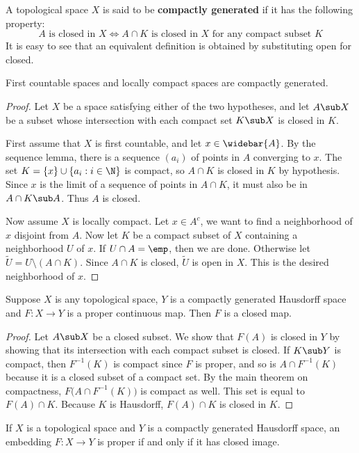 A topological space $X$ is said to be \textbf{compactly generated} if it has the following property: 
\[A\text{ is closed in $X$}\iff A\cap K\text{ is closed in $X$ for any compact subset $K$}\] 
It is easy to see that an equivalent definition is obtained by substituting open for closed.
\begin{lemma}
First countable spaces and locally compact spaces are compactly generated.
\end{lemma}
\begin{proof}
Let $X$ be a space satisfying either of the two hypotheses, and let $A\sub X$ be a subset whose intersection with each compact set $K\sub X$ is closed in $K$.\par
First assume that $X$ is first countable, and let $x\in\widebar{A}$. By the sequence lemma, there is a sequence $(a_i)$ of points in $A$ converging to $x$. The set $K=\{x\}\cup\{a_i:i\in\N\}$ is compact, so $A\cap K$ is closed in $K$ by hypothesis. Since $x$ is the limit of a sequence of points in $A\cap K$, it must also be in $A\cap K\sub A$. Thus $A$ is closed.\par
Now assume $X$ is locally compact. Let $x\in A^c$, we want to find a neighborhood of $x$ disjoint from $A$. Now let $K$ be a compact subset of $X$ containing a neighborhood $U$ of $x$. If $U\cap A=\emp$, then we are done. Otherwise let $\widetilde{U}=U\setminus(A\cap K)$. Since $A\cap K$ is closed, $\widetilde{U}$ is open in $X$. This is the desired neighborhood of $x$.
\end{proof}
\begin{theorem}\label{proper map is closed}
Suppose $X$ is any topological space, $Y$ is a compactly generated Hausdorff space and $F:X\to Y$ is a proper continuous map. Then $F$ is a closed map.
\end{theorem}
\begin{proof}
Let $A\sub X$ be a closed subset. We show that $F(A)$ is closed in $Y$ by showing that its intersection with each compact subset is closed. If $K\sub Y$ is compact, then $F^{-1}(K)$ is compact since $F$ is proper, and so is $A\cap F^{-1}(K)$ because it is a closed subset of a compact set. By the main theorem on compactness, $F\big(A\cap F^{-1}(K)\big)$ is compact as well. This set is equal to $F(A)\cap K$. Because $K$ is Hausdorff, $F(A)\cap K$ is closed in $K$.
\end{proof}
\begin{corollary}\label{compact gene embed closed map iff}
If $X$ is a topological space and $Y$ is a compactly generated Hausdorff space, an embedding $F:X\to Y$ is proper if and only if it has closed image.
\end{corollary}

